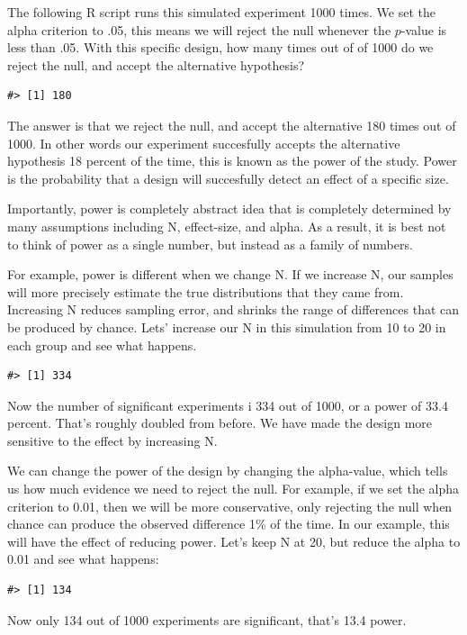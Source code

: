 \documentclass[
  letterpaper,
  DIV=11,
  numbers=noendperiod]{scrartcl}
\begin{document}
The following R script runs this simulated experiment 1000 times. We set
the alpha criterion to .05, this means we will reject the null whenever
the \(p\)-value is less than .05. With this specific design, how many
times out of of 1000 do we reject the null, and accept the alternative
hypothesis?

\begin{verbatim}
#> [1] 180
\end{verbatim}

The answer is that we reject the null, and accept the alternative 180
times out of 1000. In other words our experiment succesfully accepts the
alternative hypothesis 18 percent of the time, this is known as the
power of the study. Power is the probability that a design will
succesfully detect an effect of a specific size.

Importantly, power is completely abstract idea that is completely
determined by many assumptions including N, effect-size, and alpha. As a
result, it is best not to think of power as a single number, but instead
as a family of numbers.

For example, power is different when we change N. If we increase N, our
samples will more precisely estimate the true distributions that they
came from. Increasing N reduces sampling error, and shrinks the range of
differences that can be produced by chance. Lets' increase our N in this
simulation from 10 to 20 in each group and see what happens.

\begin{verbatim}
#> [1] 334
\end{verbatim}

Now the number of significant experiments i 334 out of 1000, or a power
of 33.4 percent. That's roughly doubled from before. We have made the
design more sensitive to the effect by increasing N.

We can change the power of the design by changing the alpha-value, which
tells us how much evidence we need to reject the null. For example, if
we set the alpha criterion to 0.01, then we will be more conservative,
only rejecting the null when chance can produce the observed difference
1\% of the time. In our example, this will have the effect of reducing
power. Let's keep N at 20, but reduce the alpha to 0.01 and see what
happens:

\begin{verbatim}
#> [1] 134
\end{verbatim}

Now only 134 out of 1000 experiments are significant, that's 13.4 power.
\end{document}
